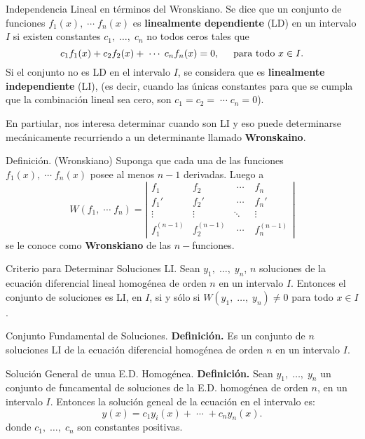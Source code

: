 \documentclass{beamer}
\begin{document}
\begin{frame}[t]
	\begin{block}{Independencia Lineal en términos del Wronskiano.}
		Se dice que un conjunto de funciones \(f_1(x) , \;\cdots\; f_n(x)\) es \textbf{linealmente dependiente} (LD) en un intervalo \(I\) si existen constantes \(c_1, \;\ldots,\; c_n\) no todos ceros tales que
		\[
			c_1f_1(x) + c_2f_2(x) + \;\cdots\; c_nf_n(x) =0, \hspace{5mm} \mbox{para todo } x \in I.
		\]
		Si el conjunto no es LD en el intervalo \(I\), se considera que es \textbf{linealmente independiente} (LI), (es decir, cuando las únicas constantes para que se cumpla que la combinación lineal sea cero, son \(c_1=c_2= \;\cdots\; c_n=0\)).
	\end{block} 
	En partiular, nos interesa determinar cuando son LI y eso puede determinarse mecánicamente recurriendo a un determinante llamado \textbf{Wronskaino}.
\end{frame}

\begin{frame}[t]
	\begin{block}{Definición. (Wronskiano)}
		Suponga que cada una de las funciones \(f_1(x) , \;\cdots\; f_n(x)\) posee al menos \(n-1\) derivadas. Luego a
		\[
			W(f_1, \;\cdots\; f_n) = \left| \begin{array}{llll}
				f_1 				& f_2 				& \;\cdots\;  				& f_n\\[2mm]
				f_1' 				& f_2' 				& \;\cdots\;  				& f_n'\\[2mm]
				\vdots & \vdots & \ddots & \vdots \\[2mm]
				f^{(n-1)}_1 				& f^{(n-1)}_2 				& \;\cdots\;  				& f^{(n-1)}_n
			\end{array}\right| 
		\]
		se le conoce como \textbf{Wronskiano} de las \(n-\)funciones.
	\end{block} 
	\begin{block}{Criterio para Determinar Soluciones LI.}
		Sean \(y_1, \;\ldots,\; y_n\), \(n\) soluciones de la ecuación diferencial lineal homogénea de orden \(n\) en un intervalo \(I\). Entonces el conjunto de soluciones es LI, en \(I\), si y sólo si \(W(y_1, \;\ldots,\; y_n) \ne 0\) para todo \(x \in I\).
	\end{block}
\end{frame}

\begin{frame}[t]
	\begin{block}{Conjunto Fundamental de Soluciones.}
		\textbf{Definición.} Es un conjunto de \(n\) soluciones LI de la ecuación diferencial homogénea de orden \(n\) en un intervalo \(I\).
	\end{block}
	\begin{block}{Solución General de unua E.D. Homogénea.}
		\textbf{Definición.} Sean \(y_1, \;\ldots,\; y_n\) un conjunto de funcamental de soluciones de la E.D. homogénea de orden \(n\), en un intervalo \(I\). Entonces la solución geneal de la ecuación en el intervalo es:
		\[
			y(x) = c_1y_i(x) + \;\cdots\; +c_ny_n(x).
		\]
		donde \(c_1, \;\ldots,\; c_n\) son constantes positivas.
	\end{block}
\end{frame}
\end{document}
